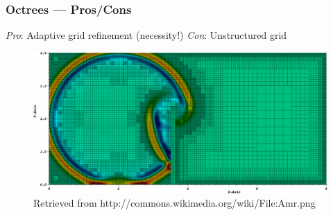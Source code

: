 \begin{frame}
\frametitle{Octrees --- Pros/Cons}


\begin{itemize}[<+(1)->]
\proitem \emph{Pro}: Adaptive grid refinement (necessity!)
\conitem \emph{Con}: Unstructured grid
\end{itemize}



\begin{figure}
\centering
\includegraphics[width=\textwidth]{Images/Attribute/AMR/Amr}
\caption{Retrieved from http://commons.wikimedia.org/\allowbreak wiki/File:Amr.png}
\end{figure}

\end{frame}
